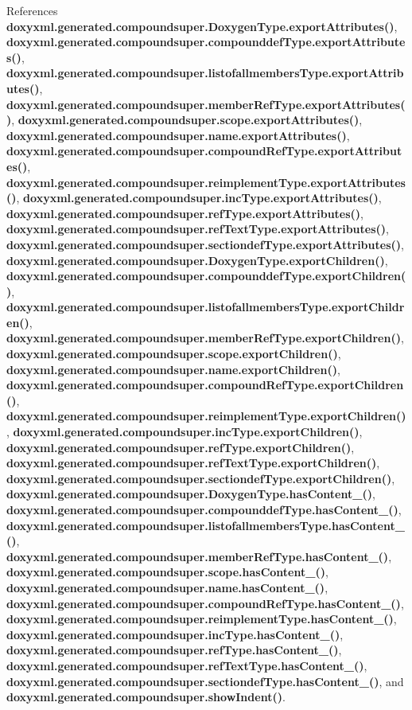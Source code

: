 References {\bf doxyxml.\+generated.\+compoundsuper.\+Doxygen\+Type.\+export\+Attributes()}, {\bf doxyxml.\+generated.\+compoundsuper.\+compounddef\+Type.\+export\+Attributes()}, {\bf doxyxml.\+generated.\+compoundsuper.\+listofallmembers\+Type.\+export\+Attributes()}, {\bf doxyxml.\+generated.\+compoundsuper.\+member\+Ref\+Type.\+export\+Attributes()}, {\bf doxyxml.\+generated.\+compoundsuper.\+scope.\+export\+Attributes()}, {\bf doxyxml.\+generated.\+compoundsuper.\+name.\+export\+Attributes()}, {\bf doxyxml.\+generated.\+compoundsuper.\+compound\+Ref\+Type.\+export\+Attributes()}, {\bf doxyxml.\+generated.\+compoundsuper.\+reimplement\+Type.\+export\+Attributes()}, {\bf doxyxml.\+generated.\+compoundsuper.\+inc\+Type.\+export\+Attributes()}, {\bf doxyxml.\+generated.\+compoundsuper.\+ref\+Type.\+export\+Attributes()}, {\bf doxyxml.\+generated.\+compoundsuper.\+ref\+Text\+Type.\+export\+Attributes()}, {\bf doxyxml.\+generated.\+compoundsuper.\+sectiondef\+Type.\+export\+Attributes()}, {\bf doxyxml.\+generated.\+compoundsuper.\+Doxygen\+Type.\+export\+Children()}, {\bf doxyxml.\+generated.\+compoundsuper.\+compounddef\+Type.\+export\+Children()}, {\bf doxyxml.\+generated.\+compoundsuper.\+listofallmembers\+Type.\+export\+Children()}, {\bf doxyxml.\+generated.\+compoundsuper.\+member\+Ref\+Type.\+export\+Children()}, {\bf doxyxml.\+generated.\+compoundsuper.\+scope.\+export\+Children()}, {\bf doxyxml.\+generated.\+compoundsuper.\+name.\+export\+Children()}, {\bf doxyxml.\+generated.\+compoundsuper.\+compound\+Ref\+Type.\+export\+Children()}, {\bf doxyxml.\+generated.\+compoundsuper.\+reimplement\+Type.\+export\+Children()}, {\bf doxyxml.\+generated.\+compoundsuper.\+inc\+Type.\+export\+Children()}, {\bf doxyxml.\+generated.\+compoundsuper.\+ref\+Type.\+export\+Children()}, {\bf doxyxml.\+generated.\+compoundsuper.\+ref\+Text\+Type.\+export\+Children()}, {\bf doxyxml.\+generated.\+compoundsuper.\+sectiondef\+Type.\+export\+Children()}, {\bf doxyxml.\+generated.\+compoundsuper.\+Doxygen\+Type.\+has\+Content\+\_\+()}, {\bf doxyxml.\+generated.\+compoundsuper.\+compounddef\+Type.\+has\+Content\+\_\+()}, {\bf doxyxml.\+generated.\+compoundsuper.\+listofallmembers\+Type.\+has\+Content\+\_\+()}, {\bf doxyxml.\+generated.\+compoundsuper.\+member\+Ref\+Type.\+has\+Content\+\_\+()}, {\bf doxyxml.\+generated.\+compoundsuper.\+scope.\+has\+Content\+\_\+()}, {\bf doxyxml.\+generated.\+compoundsuper.\+name.\+has\+Content\+\_\+()}, {\bf doxyxml.\+generated.\+compoundsuper.\+compound\+Ref\+Type.\+has\+Content\+\_\+()}, {\bf doxyxml.\+generated.\+compoundsuper.\+reimplement\+Type.\+has\+Content\+\_\+()}, {\bf doxyxml.\+generated.\+compoundsuper.\+inc\+Type.\+has\+Content\+\_\+()}, {\bf doxyxml.\+generated.\+compoundsuper.\+ref\+Type.\+has\+Content\+\_\+()}, {\bf doxyxml.\+generated.\+compoundsuper.\+ref\+Text\+Type.\+has\+Content\+\_\+()}, {\bf doxyxml.\+generated.\+compoundsuper.\+sectiondef\+Type.\+has\+Content\+\_\+()}, and {\bf doxyxml.\+generated.\+compoundsuper.\+show\+Indent()}.



